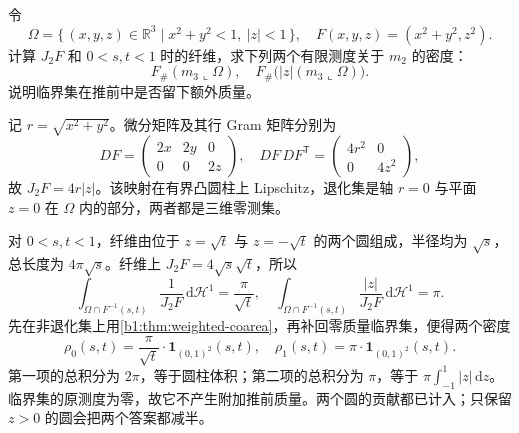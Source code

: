 \begin{exercise}\label{b1:ex:18-two-circle-vector-fibers}
令
\[
 \Omega=\{\,(x,y,z)\in\mathbb R^3\mid x^2+y^2<1,\ |z|<1\,\},
 \quad F(x,y,z)=(x^2+y^2,z^2).
\]
计算 \(J_2F\) 和 \(0<s,t<1\) 时的纤维，求下列两个有限测度关于 \(m_2\) 的密度：
\[
 F_\#(m_3\llcorner\Omega),
 \quad F_\#\bigl(|z|(m_3\llcorner\Omega)\bigr).
\]
说明临界集在推前中是否留下额外质量。
\end{exercise}
\begin{solution}
记 \(r=\sqrt{x^2+y^2}\)。微分矩阵及其行 Gram 矩阵分别为
\[
 DF=\begin{pmatrix}2x&2y&0\\0&0&2z\end{pmatrix},
 \quad DF\,DF^{\mathsf T}=\begin{pmatrix}4r^2&0\\0&4z^2\end{pmatrix},
\]
故 \(J_2F=4r|z|\)。该映射在有界凸圆柱上 Lipschitz，退化集是轴 \(r=0\) 与平面 \(z=0\) 在 \(\Omega\) 内的部分，两者都是三维零测集。

对 \(0<s,t<1\)，纤维由位于 \(z=\sqrt t\) 与 \(z=-\sqrt t\) 的两个圆组成，半径均为 \(\sqrt s\)，总长度为 \(4\pi\sqrt s\)。纤维上 \(J_2F=4\sqrt s\sqrt t\)，所以
\[
 \int_{\Omega\cap F^{-1}(s,t)}\frac1{J_2F}\,\mathrm d\mathcal H^1
 =\frac{\pi}{\sqrt t},
 \quad
 \int_{\Omega\cap F^{-1}(s,t)}\frac{|z|}{J_2F}\,\mathrm d\mathcal H^1
 =\pi.
\]
先在非退化集上用\cref{b1:thm:weighted-coarea}，再补回零质量临界集，便得两个密度
\[
 \rho_0(s,t)=\frac{\pi}{\sqrt t}\cdot\mathbf1_{(0,1)^2}(s,t),
 \quad \rho_1(s,t)=\pi\cdot\mathbf1_{(0,1)^2}(s,t).
\]
第一项的总积分为 \(2\pi\)，等于圆柱体积；第二项的总积分为 \(\pi\)，等于 \(\pi\int_{-1}^1|z|\,\mathrm dz\)。临界集的原测度为零，故它不产生附加推前质量。两个圆的贡献都已计入；只保留 \(z>0\) 的圆会把两个答案都减半。
\end{solution}

